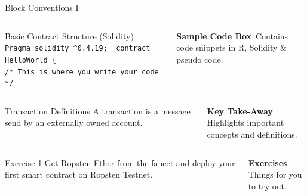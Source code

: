 \documentclass[handout]{beamer}
\begin{document}
\begin{frame}{Block Conventions I}
	
	\begin{columns}[T]
		\begin{column}{0.45\textwidth}
			\vspace{-1.0em}
			\begin{exampleblock}{Basic Contract Structure (Solidity)}
	 			\texttt{
					Pragma solidity  \textasciicircum 0.4.19; \
					contract HelloWorld \{ \\
					\color{softanthracite} /* This is where you write your code */
	 			}
			\end{exampleblock}			
		\end{column} %
		\begin{column}{0.5\textwidth}
			\textbf{Sample Code Box}\
			Contains code snippets in R, Solidity \& pseudo code.
		\end{column}
	\end{columns}

\vspace{2.0em}

	\begin{columns}[T]
		\begin{column}{0.45\textwidth}
			\vspace{-1.0em}
			\begin{alertblock}{Transaction Definitions}
				A transaction is a message send by an externally owned account.
			\end{alertblock}		
		\end{column}
		\begin{column}{0.5\textwidth}
			\textbf{Key Take-Away}\\
			Highlights important concepts and definitions.
		\end{column}
	\end{columns}

\vspace{2.0em}

	\begin{columns}[T]
		\begin{column}{0.45\textwidth}
			\vspace{-1.0em}
			\begin{block}{Exercise 1}
				Get Ropsten Ether from the faucet and deploy your first smart contract on Ropsten Testnet.
			\end{block}		
		\end{column}
		\begin{column}{0.5\textwidth}
		\textbf{Exercises}\\
			Things for you to try out.
		\end{column}
	\end{columns}

\end{frame}
\end{document}
